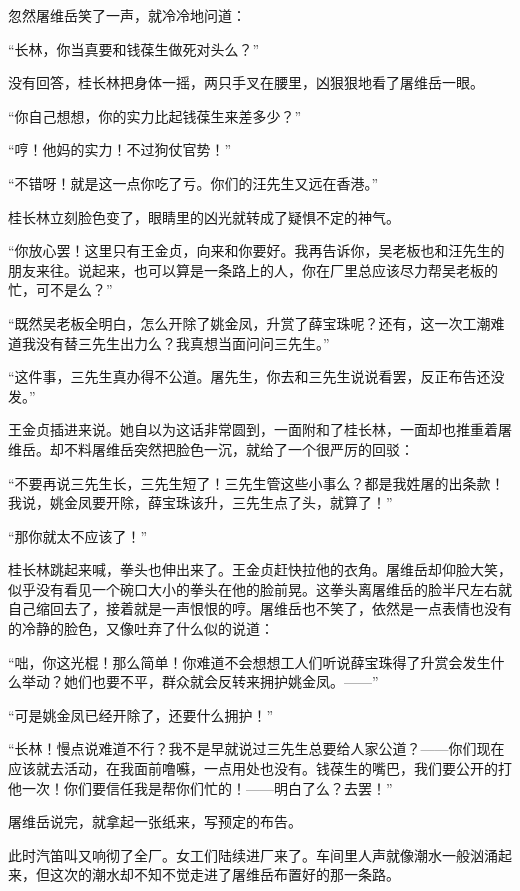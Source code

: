 \par 忽然屠维岳笑了一声，就冷冷地问道：
\par “长林，你当真要和钱葆生做死对头么？”
\par 没有回答，桂长林把身体一摇，两只手叉在腰里，凶狠狠地看了屠维岳一眼。
\par “你自己想想，你的实力比起钱葆生来差多少？”
\par “哼！他妈的实力！不过狗仗官势！”
\par “不错呀！就是这一点你吃了亏。你们的汪先生又远在香港。”
\par 桂长林立刻脸色变了，眼睛里的凶光就转成了疑惧不定的神气。
\par “你放心罢！这里只有王金贞，向来和你要好。我再告诉你，吴老板也和汪先生的朋友来往。说起来，也可以算是一条路上的人，你在厂里总应该尽力帮吴老板的忙，可不是么？”
\par “既然吴老板全明白，怎么开除了姚金凤，升赏了薛宝珠呢？还有，这一次工潮难道我没有替三先生出力么？我真想当面问问三先生。”
\par “这件事，三先生真办得不公道。屠先生，你去和三先生说说看罢，反正布告还没发。”
\par 王金贞插进来说。她自以为这话非常圆到，一面附和了桂长林，一面却也推重着屠维岳。却不料屠维岳突然把脸色一沉，就给了一个很严厉的回驳：
\par “不要再说三先生长，三先生短了！三先生管这些小事么？都是我姓屠的出条款！我说，姚金凤要开除，薛宝珠该升，三先生点了头，就算了！”
\par “那你就太不应该了！”
\par 桂长林跳起来喊，拳头也伸出来了。王金贞赶快拉他的衣角。屠维岳却仰脸大笑，似乎没有看见一个碗口大小的拳头在他的脸前晃。这拳头离屠维岳的脸半尺左右就自己缩回去了，接着就是一声恨恨的哼。屠维岳也不笑了，依然是一点表情也没有的冷静的脸色，又像吐弃了什么似的说道：
\par “咄，你这光棍！那么简单！你难道不会想想工人们听说薛宝珠得了升赏会发生什么举动？她们也要不平，群众就会反转来拥护姚金凤。——”
\par “可是姚金凤已经开除了，还要什么拥护！”
\par “长林！慢点说难道不行？我不是早就说过三先生总要给人家公道？——你们现在应该就去活动，在我面前噜囌，一点用处也没有。钱葆生的嘴巴，我们要公开的打他一次！你们要信任我是帮你们忙的！——明白了么？去罢！”
\par 屠维岳说完，就拿起一张纸来，写预定的布告。
\par 此时汽笛叫又响彻了全厂。女工们陆续进厂来了。车间里人声就像潮水一般汹涌起来，但这次的潮水却不知不觉走进了屠维岳布置好的那一条路。
